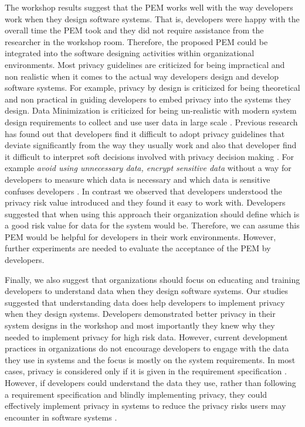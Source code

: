 \documentclass{sigchi}
\begin{document}
The workshop results suggest that the PEM works well with the way developers work when they design software systems. That is, developers were happy with the overall time the PEM took and they did not require assistance from the researcher in the workshop room. Therefore, the proposed PEM could be integrated into the software designing activities within organizational environments. Most privacy guidelines are criticized for being impractical and non realistic when it comes to the actual way developers design and develop software systems. For example, privacy by design is criticized for being theoretical and non practical in guiding developers to embed privacy into the systems they design. Data Minimization is criticized for being un-realistic with modern system design requirements to collect and use user data in large scale \cite {marr2015big}. Previous research has found out that developers find it difficult to adopt privacy guidelines that deviate significantly from the way they usually work and also that developer find it difficult to interpret soft decisions involved with privacy decision making \cite {ayalon2017developers}. For example \textit{avoid using unnecessary data, encrypt sensitive data} without a way for developers to measure which data is necessary and which data is sensitive confuses developers \cite {oetzel2014systematic}. In contrast we observed that developers understood the privacy risk value introduced and they found it easy to work with. Developers suggested that when using this approach their organization should define which is a good risk value for data for the system would be. Therefore, we can assume this PEM would be helpful for developers in their work environments. However, further experiments are needed to evaluate the acceptance of the PEM by developers.

Finally, we also suggest that organizations should focus on educating and training developers to understand data when they design software systems. Our studies suggested that understanding data does help developers to implement privacy when they design systems. Developers demonstrated better privacy in their system designs in the workshop and most importantly they knew why they needed to implement privacy for high risk data. However, current development practices in organizations do not encourage developers to engage with the data they use in systems and the focus is mostly on the system requirements. In most cases, privacy is considered only if it is given in the requirement specification \cite {hadar2017privacy, senarath2018why}. However, if developers could understand the data they use, rather than following a requirement specification and blindly implementing privacy, they could effectively implement privacy in systems to reduce the privacy risks users may encounter in software systems \cite {marr2015big, tene2012big}. 
\end{document}
